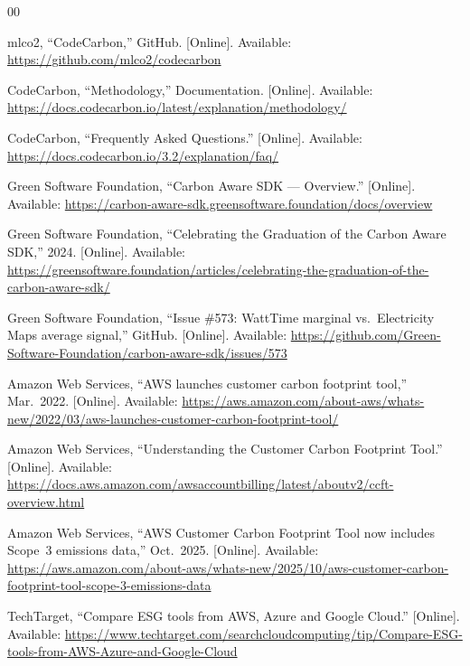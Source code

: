 ﻿\documentclass[conference]{IEEEtran}
\begin{document}
\begin{thebibliography}{00}

mlco2, ``CodeCarbon,'' GitHub. [Online]. Available:
\url{https://github.com/mlco2/codecarbon}

CodeCarbon, ``Methodology,'' Documentation. [Online]. Available:
\url{https://docs.codecarbon.io/latest/explanation/methodology/}

CodeCarbon, ``Frequently Asked Questions.'' [Online]. Available:
\url{https://docs.codecarbon.io/3.2/explanation/faq/}

Green Software Foundation, ``Carbon Aware SDK --- Overview.'' [Online]. Available:
\url{https://carbon-aware-sdk.greensoftware.foundation/docs/overview}

Green Software Foundation, ``Celebrating the Graduation of the Carbon Aware SDK,''
2024. [Online]. Available:
\url{https://greensoftware.foundation/articles/celebrating-the-graduation-of-the-carbon-aware-sdk/}

Green Software Foundation, ``Issue \#573: WattTime marginal vs.\ Electricity Maps
average signal,'' GitHub. [Online]. Available:
\url{https://github.com/Green-Software-Foundation/carbon-aware-sdk/issues/573}

Amazon Web Services, ``AWS launches customer carbon footprint tool,'' Mar.\ 2022.
[Online]. Available:
\url{https://aws.amazon.com/about-aws/whats-new/2022/03/aws-launches-customer-carbon-footprint-tool/}

Amazon Web Services, ``Understanding the Customer Carbon Footprint Tool.''
[Online]. Available:
\url{https://docs.aws.amazon.com/awsaccountbilling/latest/aboutv2/ccft-overview.html}

Amazon Web Services, ``AWS Customer Carbon Footprint Tool now includes Scope~3
emissions data,'' Oct.\ 2025. [Online]. Available:
\url{https://aws.amazon.com/about-aws/whats-new/2025/10/aws-customer-carbon-footprint-tool-scope-3-emissions-data}

TechTarget, ``Compare ESG tools from AWS, Azure and Google Cloud.'' [Online].
Available:
\url{https://www.techtarget.com/searchcloudcomputing/tip/Compare-ESG-tools-from-AWS-Azure-and-Google-Cloud}


\end{thebibliography}
\end{document}
